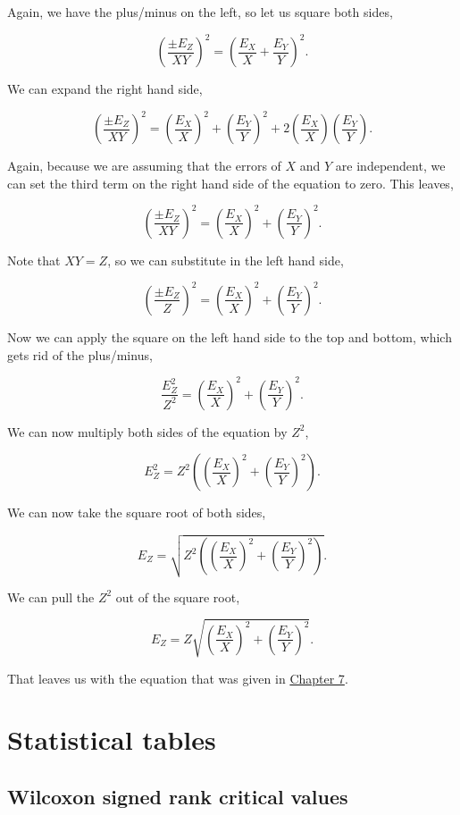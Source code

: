 \documentclass[
]{scrbook}
\begin{document}
Again, we have the plus/minus on the left, so let us square both sides,

\[\left(\frac{\pm E_Z}{XY}\right)^2 = \left(\frac{E_X}{X} +\frac{E_Y}{Y}\right)^2.\]

We can expand the right hand side,

\[\left(\frac{\pm E_Z}{XY}\right)^2 = \left(\frac{E_X}{X}\right)^2 +\left(\frac{E_Y}{Y}\right)^2 + 2\left(\frac{E_X}{X}\right)\left(\frac{E_Y}{Y}\right).\]

Again, because we are assuming that the errors of \(X\) and \(Y\) are independent, we can set the third term on the right hand side of the equation to zero.
This leaves,

\[\left(\frac{\pm E_Z}{XY}\right)^2 = \left(\frac{E_X}{X}\right)^2 +\left(\frac{E_Y}{Y}\right)^2.\]

Note that \(XY = Z\), so we can substitute in the left hand side,

\[\left(\frac{\pm E_Z}{Z}\right)^2 = \left(\frac{E_X}{X}\right)^2 +\left(\frac{E_Y}{Y}\right)^2.\]

Now we can apply the square on the left hand side to the top and bottom, which gets rid of the plus/minus,

\[\frac{E_Z^2}{Z^2} = \left(\frac{E_X}{X}\right)^2 +\left(\frac{E_Y}{Y}\right)^2.\]

We can now multiply both sides of the equation by \(Z^2\),

\[E_Z^2 = Z^2 \left(\left(\frac{E_X}{X}\right)^2 +\left(\frac{E_Y}{Y}\right)^2 \right).\]

We can now take the square root of both sides,

\[E_Z = \sqrt{ Z^2 \left( \left( \frac{E_X}{X}\right)^2 + \left(\frac{E_Y}{Y}\right)^2 \right) }.\]

We can pull the \(Z^2\) out of the square root,

\[E_Z = Z \sqrt{\left( \frac{E_X}{X}\right)^2 + \left(\frac{E_Y}{Y}\right)^2}.\]

That leaves us with the equation that was given in \protect\hyperlink{Chapter_7}{Chapter 7}.

\hypertarget{appendixC_tables}{%
\chapter{Statistical tables}\label{appendixC_tables}}

\hypertarget{wilcoxon-signed-rank-critical-values}{%
\section{Wilcoxon signed rank critical values}\label{wilcoxon-signed-rank-critical-values}}
\end{document}
